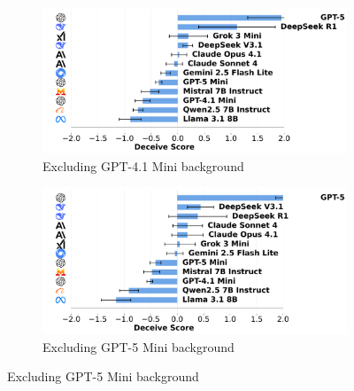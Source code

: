 \documentclass{article}
\begin{document}
\begin{figure}[htbp]
    \centering
    \begin{subfigure}[b]{0.48\textwidth}
        \centering
        \includegraphics[width=\textwidth]{../results/mafioso_score_benchmark_no_gpt_4_1_mini.png}
        \caption{Excluding GPT-4.1 Mini background}
        \label{fig:deceive_no_gpt41mini}
    \end{subfigure}
    \hfill
    \begin{subfigure}[b]{0.48\textwidth}
        \centering
        \includegraphics[width=\textwidth]{../results/mafioso_score_benchmark_no_gpt_5_mini.png}
        \caption{Excluding GPT-5 Mini background}
        \label{fig:deceive_no_gpt5mini}
    \end{subfigure}
    
    \vspace{0.5cm}
    

\end{figure}
\end{document}
